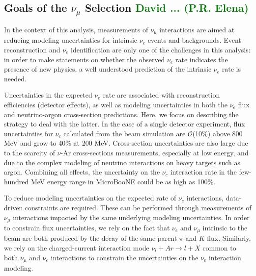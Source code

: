\subsection{Goals of the $\nu_{\mu}$ Selection \textcolor{green}{David   ... (P.R. Elena)}}
\label{ssec:goalsofnumusel}

\par In the context of this analysis, measurements of $\nu_{\mu}$ interactions are aimed at reducing modeling uncertainties for intrinsic $\nu_e$ events and backgrounds. Event reconstruction and $\nu_e$ identification are only one of the challenges in this analysis:  in order to make statements on whether the observed $\nu_e$ rate indicates the presence of new physics, a well understood prediction of the intrinsic $\nu_e$ rate is needed. 

\par Uncertainties in the expected $\nu_e$ rate are associated with reconstruction efficiencies (detector effects), as well as modeling uncertainties in both the $\nu_e$ flux  and neutrino-argon cross-section predictions. Here, we focus on describing the strategy to deal with the latter. In the case of a single detector experiment, %
flux uncertainties for $\nu_e$ calculated from the beam simulation are $\mathcal{O}$(10\%) above 800 MeV and grow to 40\% at 200 MeV. Cross-section uncertainties are also large due to the scarcity of $\nu$-Ar cross-sections measurements, especially at low energy, and due to the complex modeling of neutrino interactions on heavy targets such as argon. Combining all effects, the uncertainty on the $\nu_e$ interaction rate in the few-hundred MeV energy range in MicroBooNE could be as high as 100\%.
\par To reduce modeling uncertainties on the expected rate of $\nu_e$ interactions, data-driven constraints are required. These can be performed through measurements of $\nu_{\mu}$ interactions impacted by the same underlying modeling uncertainties. In order to constrain flux uncertainties, we rely on the fact that $\nu_e$ and $\nu_{\mu}$ intrinsic to the beam are both produced by the decay of the same parent $\pi$ and $K$ flux. Similarly, we rely on the charged-current interaction mode $\nu_{l} + Ar \rightarrow l + X$ common to both $\nu_{\mu}$ and $\nu_e$ interactions to constrain the uncertainties on the $\nu_e$ interaction modeling.


